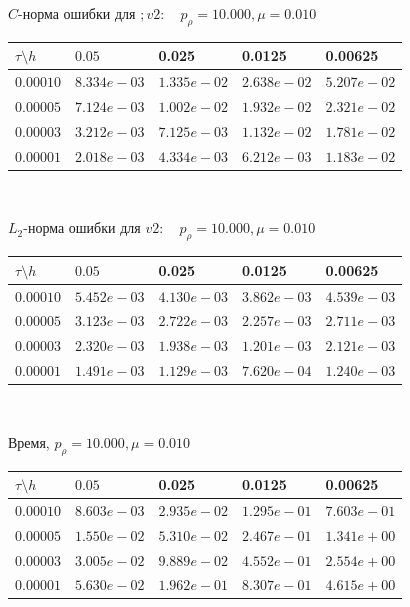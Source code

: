 \documentclass[a4paper, 25pt]{article}
\begin{document}
\begin{center}
 $C$-норма ошибки для $;v2: \quad p_{\rho}=10.000, \mu = 0.010 $
\begin{tabular}{|p{0.6in}|p{0.7in}|p{0.7in}|p{0.7in}|p{0.7in}|} \hline
$\tau\setminus h$ & $0.05$ & 0.025& 0.0125 & 0.00625 \\ \hline
$0.00010$ & $8.334e-03$ &$1.335e-02$ &$2.638e-02$ &$5.207e-02$  \\ \hline
$0.00005$ & $7.124e-03$ &$1.002e-02$ &$1.932e-02$ &$2.321e-02$  \\ \hline
$0.00003$ & $3.212e-03$ &$7.125e-03$ &$1.132e-02$ &$1.781e-02$  \\ \hline
$0.00001$ & $2.018e-03$ &$4.334e-03$ &$6.212e-03$ &$1.183e-02$  \\ \hline
\end{tabular}\\[20pt]
\end{center}

\begin{center}
$L_2$-норма ошибки для $v2: \quad p_{\rho}=10.000, \mu = 0.010  $
\begin{tabular}{|p{0.6in}|p{0.7in}|p{0.7in}|p{0.7in}|p{0.7in}|} \hline
$\tau\setminus h$ & $0.05$ & 0.025& 0.0125 & 0.00625 \\ \hline
$0.00010$ & $5.452e-03$ &$4.130e-03$ &$3.862e-03$ &$4.539e-03$  \\ \hline
$0.00005$ & $3.123e-03$ &$2.722e-03$ &$2.257e-03$ &$2.711e-03$  \\ \hline
$0.00003$ & $2.320e-03$ &$1.938e-03$ &$1.201e-03$ &$2.121e-03$  \\ \hline
$0.00001$ & $1.491e-03$ &$1.129e-03$ &$7.620e-04$ &$1.240e-03$  \\ \hline
\end{tabular}\\[20pt]
\end{center}

\begin{center}
Время, $p_{\rho}=10.000, \mu = 0.010  $
\begin{tabular}{|p{0.6in}|p{0.7in}|p{0.7in}|p{0.7in}|p{0.7in}|} \hline
$\tau\setminus h$ & $0.05$ & 0.025& 0.0125 & 0.00625 \\ \hline
$0.00010$ & $8.603e-03$ &$2.935e-02$ &$1.295e-01$ &$7.603e-01$  \\ \hline
$0.00005$ & $1.550e-02$ &$5.310e-02$ &$2.467e-01$ &$1.341e+00$  \\ \hline
$0.00003$ & $3.005e-02$ &$9.889e-02$ &$4.552e-01$ &$2.554e+00$  \\ \hline
$0.00001$ & $5.630e-02$ &$1.962e-01$ &$8.307e-01$ &$4.615e+00$  \\ \hline
\end{tabular}\\[20pt]
\end{center}
\end{document}

